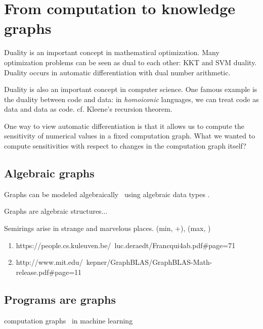 \documentclass[11pt]{article}
\begin{document}
    \pagebreak


    \section{From computation to knowledge graphs}\label{sec:graphs}


    Duality is an important concept in mathematical optimization. Many optimization problems can be seen as dual to each other: KKT and SVM duality. Duality occurs in automatic differentiation with dual number arithmetic.

    Duality is also an important concept in computer science. One famous example is the duality between code and data: in \textit{homoiconic} languages, we can treat code as data and data as code. cf. Kleene's recursion theorem.

    One way to view automatic differentiation is that it allows us to compute the sensitivity of numerical values in a fixed computation graph. What we wanted to compute sensitivities with respect to changes in the computation graph itself?

    \subsection{Algebraic graphs}\label{subsec:algebraic-graphs}

    Graphs can be modeled algebraically~\citep{weisfeiler1968reduction}  using algebraic data types \citep{mokhov2017algebraic}.

    Graphs are algebraic structures...

    Semirings arise in strange and marvelous places. (min, +), (max, \times)

    \begin{enumerate}
        \item https://people.cs.kuleuven.be/~luc.deraedt/Francqui4ab.pdf#page=71
        \item http://www.mit.edu/~kepner/GraphBLAS/GraphBLAS-Math-release.pdf#page=11
    \end{enumerate}

    \subsection{Programs are graphs}\label{sec:program-graphs}

    computation graphs~\citep{breuleux2017automatic} in machine learning
\end{document}
